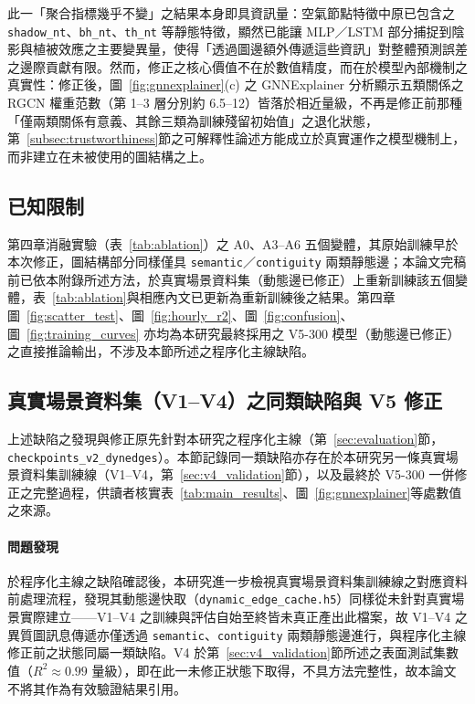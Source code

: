 此一「聚合指標幾乎不變」之結果本身即具資訊量：空氣節點特徵中原已包含之 \texttt{shadow\_nt}、\texttt{bh\_nt}、\texttt{th\_nt} 等靜態特徵，顯然已能讓 MLP／LSTM 部分捕捉到陰影與植被效應之主要變異量，使得「透過圖邊額外傳遞這些資訊」對整體預測誤差之邊際貢獻有限。然而，修正之核心價值不在於數值精度，而在於模型內部機制之真實性：修正後，圖~\ref{fig:gnnexplainer}(c) 之 GNNExplainer 分析顯示五類關係之 RGCN 權重范數（第 1--3 層分別約 6.5--12）皆落於相近量級，不再是修正前那種「僅兩類關係有意義、其餘三類為訓練殘留初始值」之退化狀態，第~\ref{subsec:trustworthiness}節之可解釋性論述方能成立於真實運作之模型機制上，而非建立在未被使用的圖結構之上。

\subsection{已知限制}

第四章消融實驗（表~\ref{tab:ablation}）之 A0、A3--A6 五個變體，其原始訓練早於本次修正，圖結構部分同樣僅具 \texttt{semantic}／\texttt{contiguity} 兩類靜態邊；本論文完稿前已依本附錄所述方法，於真實場景資料集（動態邊已修正）上重新訓練該五個變體，表~\ref{tab:ablation}與相應內文已更新為重新訓練後之結果。第四章圖~\ref{fig:scatter_test}、圖~\ref{fig:hourly_r2}、圖~\ref{fig:confusion}、圖~\ref{fig:training_curves} 亦均為本研究最終採用之 V5-300 模型（動態邊已修正）之直接推論輸出，不涉及本節所述之程序化主線缺陷。


\subsection{真實場景資料集（V1--V4）之同類缺陷與 V5 修正}
\label{appx:v5_dynamic_edges_fix}

上述缺陷之發現與修正原先針對本研究之程序化主線（第~\ref{sec:evaluation}節，\texttt{checkpoints\_v2\_dynedges}）。本節記錄同一類缺陷亦存在於本研究另一條真實場景資料集訓練線（V1--V4，第~\ref{sec:v4_validation}節），以及最終於 V5-300 一併修正之完整過程，供讀者核實表~\ref{tab:main_results}、圖~\ref{fig:gnnexplainer}等處數值之來源。

\paragraph{問題發現} 於程序化主線之缺陷確認後，本研究進一步檢視真實場景資料集訓練線之對應資料前處理流程，發現其動態邊快取（\texttt{dynamic\_edge\_cache.h5}）同樣從未針對真實場景實際建立——V1--V4 之訓練與評估自始至終皆未真正產出此檔案，故 V1--V4 之異質圖訊息傳遞亦僅透過 \texttt{semantic}、\texttt{contiguity} 兩類靜態邊進行，與程序化主線修正前之狀態同屬一類缺陷。V4 於第~\ref{sec:v4_validation}節所述之表面測試集數值（$R^2 \approx 0.99$ 量級），即在此一未修正狀態下取得，不具方法完整性，故本論文不將其作為有效驗證結果引用。

